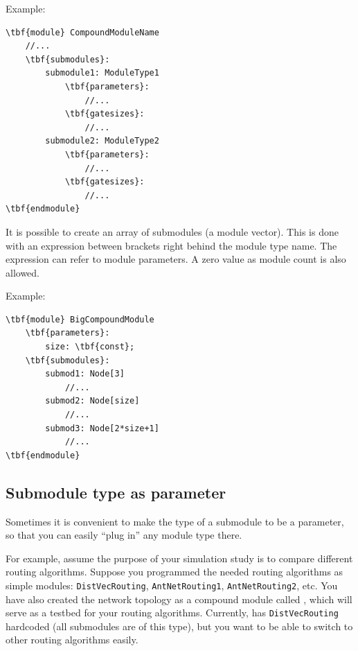 Example:

\begin{Verbatim}[commandchars=\\\{\}]
\tbf{module} CompoundModuleName
    //...
    \tbf{submodules}:
        submodule1: ModuleType1
            \tbf{parameters}:
                //...
            \tbf{gatesizes}:
                //...
        submodule2: ModuleType2
            \tbf{parameters}:
                //...
            \tbf{gatesizes}:
                //...
\tbf{endmodule}
\end{Verbatim}




It is possible to create an array of
submodules (a module
vector).  This is done with an expression between
brackets right behind the module type name. The expression can refer
to module parameters. A zero value as module count is also allowed.

Example:

\begin{Verbatim}[commandchars=\\\{\}]
\tbf{module} BigCompoundModule
    \tbf{parameters}:
        size: \tbf{const};
    \tbf{submodules}:
        submod1: Node[3]
            //...
        submod2: Node[size]
            //...
        submod3: Node[2*size+1]
            //...
\tbf{endmodule}
\end{Verbatim}



\subsection{Submodule type as parameter}

Sometimes it is convenient to make the type of a submodule
to be a parameter, so that you can easily ``plug in''
any module type there.

For example, assume the purpose of your simulation study is
to compare different routing algorithms. Suppose you programmed
the needed routing algorithms as simple modules: \texttt{DistVecRouting},
\texttt{AntNetRouting1}, \texttt{AntNetRouting2}, etc.
You have also created the network topology as a compound module
called , which will serve as a testbed for your routing
algorithms. Currently,  has \texttt{DistVecRouting}
hardcoded (all submodules are of this type), but you want
to be able to switch to other routing algorithms easily.

